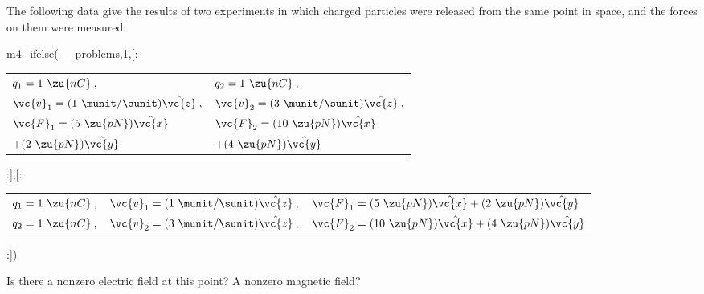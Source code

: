 The following data give the results of two experiments in which charged particles
        were released from the same point in space, and the forces on them were measured:

m4_ifelse(__problems,1,[:
        \begin{tabular}{ll}
                $q_1=1\ \zu{nC}\:,$ 
                     & $q_2=1\ \zu{nC}\:,$   \\
                $\vc{v}_1=(1\ \munit/\sunit)\hat{\vc{z}}\:,$ 
                     & $\vc{v}_2=(3\ \munit/\sunit)\hat{\vc{z}}\:,$ \\
                $\vc{F}_1=(5\ \zu{pN})\hat{\vc{x}}$
                   & $\vc{F}_2=(10\ \zu{pN})\hat{\vc{x}}$\\
                \hfill $+(2\ \zu{pN})\hat{\vc{y}}$
                   & \hfill $+(4\ \zu{pN})\hat{\vc{y}}$ \\
        \end{tabular}
:],[:
        \begin{tabular}{lll}
                $q_1=1\ \zu{nC}\:,$ & $\vc{v}_1=(1\ \munit/\sunit)\hat{\vc{z}}\:,$ & $\vc{F}_1=(5\ \zu{pN})\hat{\vc{x}}+(2\ \zu{pN})\hat{\vc{y}}$\\
                $q_2=1\ \zu{nC}\:,$ & $\vc{v}_2=(3\ \munit/\sunit)\hat{\vc{z}}\:,$ & $\vc{F}_2=(10\ \zu{pN})\hat{\vc{x}}+(4\ \zu{pN})\hat{\vc{y}}$\\
        \end{tabular}
:])


        \noindent Is there a nonzero electric field at this point? A nonzero magnetic field?
